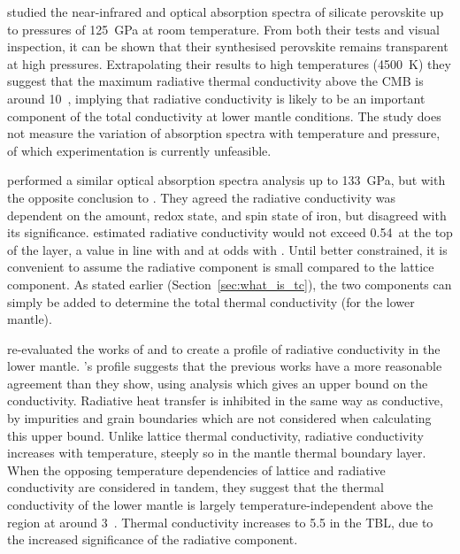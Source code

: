 \citet{Keppler2008} studied the near-infrared and optical absorption spectra of silicate perovskite up to pressures of 125~GPa at room temperature. From both their tests and visual inspection, it can be shown that their synthesised perovskite remains transparent at high pressures. Extrapolating their results to high temperatures (4500~K) they suggest that the maximum radiative thermal conductivity above the CMB is around 10~\wmk, implying that radiative conductivity is likely to be an important component of the total conductivity at lower mantle conditions. The study does not measure the variation of absorption spectra with temperature and pressure, of which experimentation is currently unfeasible.

\citet{Goncharov2008} performed a similar optical absorption spectra analysis up to 133~GPa, but with the opposite conclusion to \citet{Keppler2008}. They agreed the radiative conductivity was dependent on the amount, redox state, and spin state of iron, but disagreed with its significance. \citet{Goncharov2008} estimated radiative conductivity would not exceed 0.54~\wmks at the top of the \ddds layer, a value in line with \citet{Hofmeister1999} and at odds with \citet{Keppler2008}. Until better constrained, it is convenient to assume the radiative component is small compared to the lattice component. As stated earlier (Section~\ref{sec:what_is_tc}), the two components can simply be added to determine the total thermal conductivity (for the lower mantle).

\citet{Tang2014} re-evaluated the works of \citet{Keppler2008} and \citet{Goncharov2008} to create a profile of radiative conductivity in the lower mantle. \citeauthor{Tang2014}'s profile suggests that the previous works have a more reasonable agreement than they show, using analysis which gives an upper bound on the conductivity. Radiative heat transfer is inhibited in the same way as conductive, by impurities and grain boundaries which are not considered when calculating this upper bound. Unlike lattice thermal conductivity, radiative conductivity increases with temperature, steeply so in the mantle thermal boundary layer. When the opposing temperature dependencies of lattice and radiative conductivity are considered in tandem, they suggest that the thermal conductivity of the lower mantle is largely temperature-independent above the \ddds region at around 3~\wmk. Thermal conductivity increases to 5.5 \wmks in the TBL, due to the increased significance of the radiative component.



